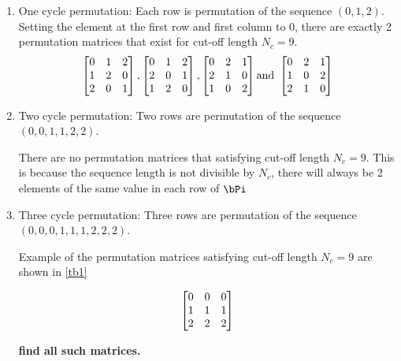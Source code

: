 \documentclass[11pt, oneside, dvipdfmx]{book}
\begin{document}
\begin{enumerate}
	\item One cycle permutation: Each row is permutation of the sequence $(0,1,2)$. Setting the element at the first row and first column to $0$, there are exactly 2 permutation matrices that exist for cut-off length $N_c = 9$.
	\begin{equation}
	\begin{bmatrix}
	0 & 1 & 2\cr
	1 & 2 & 0\cr
	2 & 0 & 1
	\end{bmatrix}
	,
	\begin{bmatrix}
	0 & 1 & 2\cr
	2 & 0 & 1\cr
	1 & 2 & 0
	\end{bmatrix}
	,
	\begin{bmatrix}
	0 & 2 & 1\cr
	2 & 1 & 0\cr
	1 & 0 & 2
	\end{bmatrix}
	\text{and }
	\begin{bmatrix}
	0 & 2 & 1\cr
	1 & 0 & 2\cr
	2 & 1 & 0
	\end{bmatrix}
	\end{equation}
	
	
	\item Two cycle permutation: Two rows are permutation of the sequence $(0,0,1,1,2,2)$.
	
	There are no permutation matrices that satisfying cut-off length $N_c = 9$. This is because the sequence length is not divisible by $N_c$, there will always be 2 elements of the same value in each row of $\bPi$
	
	
	\item Three cycle permutation: Three rows are permutation of the sequence$(0,0,0,1,1,1,2,2,2)$. 
	
	Example of the permutation matrices satisfying cut-off length $N_c = 9$ are shown in \ref{tb1}
	
	\begin{eqnarray}
	\begin{bmatrix}
	0 & 0 & 0\cr
	1 & 1 & 1\cr
	2 & 2 & 2
	\end{bmatrix}
	\label{Eq:2}
	\end{eqnarray}
	
	{\bf find all such matrices.}
\end{enumerate}
\end{document}

